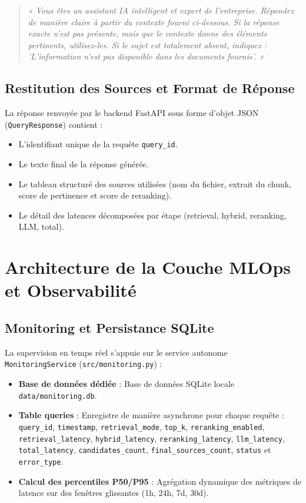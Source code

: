 \begin{quote}
\small
\textit{« Vous êtes un assistant IA intelligent et expert de l'entreprise. Répondez de manière claire à partir du contexte fourni ci-dessous. Si la réponse exacte n'est pas présente, mais que le contexte donne des éléments pertinents, utilisez-les. Si le sujet est totalement absent, indiquez : 'L'information n'est pas disponible dans les documents fournis'. »}
\end{quote}

\subsection{Restitution des Sources et Format de Réponse}
La réponse renvoyée par le backend FastAPI sous forme d'objet JSON (\texttt{QueryResponse}) contient :
\begin{itemize}
    \item L'identifiant unique de la requête \texttt{query\_id}.
    \item Le texte final de la réponse générée.
    \item Le tableau structuré des sources utilisées (nom du fichier, extrait du chunk, score de pertinence et score de reranking).
    \item Le détail des latences décomposées par étape (retrieval, hybrid, reranking, LLM, total).
\end{itemize}

\section{Architecture de la Couche MLOps et Observabilité}

\subsection{Monitoring et Persistance SQLite}
La supervision en temps réel s'appuie sur le service autonome \texttt{MonitoringService} (\texttt{src/monitoring.py}) :
\begin{itemize}
    \item \textbf{Base de données dédiée} : Base de données SQLite locale \texttt{data/monitoring.db}.
    \item \textbf{Table queries} : Enregistre de manière asynchrone pour chaque requête : \texttt{query\_id}, \texttt{timestamp}, \texttt{retrieval\_mode}, \texttt{top\_k}, \texttt{reranking\_enabled}, \texttt{retrieval\_latency}, \texttt{hybrid\_latency}, \texttt{reranking\_latency}, \texttt{llm\_latency}, \texttt{total\_latency}, \texttt{candidates\_count}, \texttt{final\_sources\_count}, \texttt{status} et \texttt{error\_type}.
    \item \textbf{Calcul des percentiles P50/P95} : Agrégation dynamique des métriques de latence sur des fenêtres glissantes (1h, 24h, 7d, 30d).
\end{itemize}

